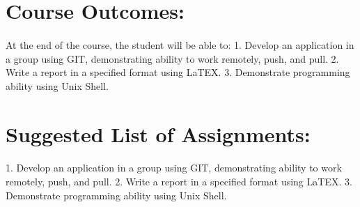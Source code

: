 \documentclass{article}
\begin{document}
\section{Course Outcomes:}
\paragraph{}
At the end of the course, the student will be able to:
1. Develop an application in a group using GIT, demonstrating ability to work remotely,
push, and pull.
2. Write a report in a specified format using LaTEX.
3. Demonstrate programming ability using Unix Shell.

\section{Suggested List of Assignments:}
\paragraph{}
1. Develop an application in a group using GIT, demonstrating ability to work remotely,
push, and pull.
2. Write a report in a specified format using LaTEX.
3. Demonstrate programming ability using Unix Shell.
\end{document}
